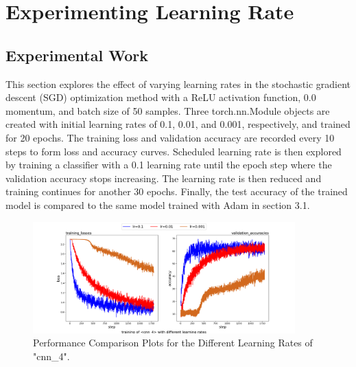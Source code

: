 \documentclass[3p,times,procedia]{elsarticle}
\begin{document}
\section{\textbf{Experimenting Learning Rate}}

\subsection{\textbf{Experimental Work}}
This section explores the effect of varying learning rates in the stochastic gradient descent (SGD) optimization method with a ReLU activation function, 0.0 momentum, and batch size of 50 samples. Three torch.nn.Module objects are created with initial learning rates of 0.1, 0.01, and 0.001, respectively, and trained for 20 epochs. The training loss and validation accuracy are recorded every 10 steps to form loss and accuracy curves.
Scheduled learning rate is then explored by training a classifier with a 0.1 learning rate until the epoch step where the validation accuracy stops increasing. The learning rate is then reduced and training continues for another 30 epochs. Finally, the test accuracy of the trained model is compared to the same model trained with Adam in section 3.1.

\begin{figure}[H]
    \centering
    \includegraphics[width=0.9\textwidth, trim={0 1cm 0 1cm}]{figures/cc.png}
    \caption{Performance Comparison Plots for the Different Learning Rates of "cnn\_4".} 
    \label{fig:LR}
\end{figure}
\end{document}
